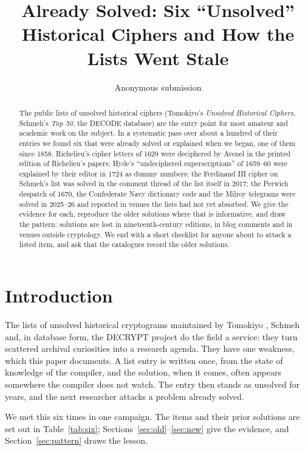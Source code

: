 \documentclass[11pt]{article}
\title{Already Solved: Six ``Unsolved'' Historical Ciphers and How the Lists Went Stale}
\author{Anonymous submission}
\date{}
\begin{document}
\maketitle

\begin{abstract}
The public lists of unsolved historical ciphers (Tomokiyo's \emph{Unsolved Historical Ciphers}, Schmeh's \emph{Top 50}, the DECODE database) are the entry point for most amateur and academic work on the subject. In a systematic pass over about a hundred of their entries we found six that were already solved or explained when we began, one of them since 1858. Richelieu's cipher letters of 1629 were deciphered by Avenel in the printed edition of Richelieu's papers; Hyde's ``undeciphered superscriptions'' of 1659--60 were explained by their editor in 1724 as dummy numbers; the Ferdinand III cipher on Schmeh's list was solved in the comment thread of the list itself in 2017; the Perwich despatch of 1670, the Confederate Navy dictionary code and the Milroy telegrams were solved in 2025--26 and reported in venues the lists had not yet absorbed. We give the evidence for each, reproduce the older solutions where that is informative, and draw the pattern: solutions are lost in nineteenth-century editions, in blog comments and in venues outside cryptology. We end with a short checklist for anyone about to attack a listed item, and ask that the catalogues record the older solutions.
\end{abstract}

\section{Introduction}

The lists of unsolved historical cryptograms maintained by Tomokiyo , Schmeh  and, in database form, the DECRYPT project \cite{Megyesi:2020,DECODE} do the field a service: they turn scattered archival curiosities into a research agenda. They have one weakness, which this paper documents. A list entry is written once, from the state of knowledge of the compiler, and the solution, when it comes, often appears somewhere the compiler does not watch. The entry then stands as unsolved for years, and the next researcher attacks a problem already solved.

We met this six times in one campaign. The items and their prior solutions are set out in Table~\ref{tab:six}; Sections~\ref{sec:old}--\ref{sec:new} give the evidence, and Section~\ref{sec:pattern} draws the lesson.
\end{document}
